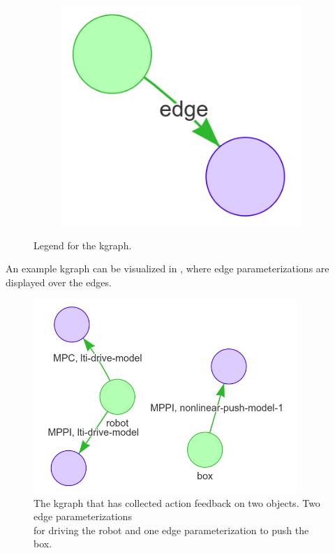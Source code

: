 \begin{figure}[H]
\begin{subfigure}{0.3\textwidth}
    \centering
    \includegraphics[width=\textwidth]{figures/proposed_method/kgraph_edge}
    \caption{}
    \end{subfigure}
    \caption{Legend for the \acl{kgraph}.}%
    \label{fig:kgraph_legend}
\end{figure}

An example \ac{kgraph} can be visualized in , where edge parameterizations are displayed over the edges.\bs

\begin{figure}[H]
    \centering
    \includegraphics[width=10cm]{figures/proposed_method/kgraph_example}
    \caption{The \ac{kgraph} that has collected action feedback on two objects. Two edge parameterizations\\for driving the robot and one edge parameterization to push the box.}%
    \label{fig:kgraph_example}
\end{figure}

